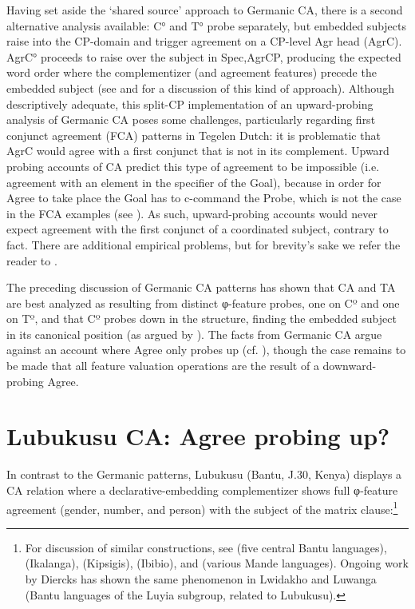 \documentclass[output=paper
,modfonts
,nonflat
]{langsci/langscibook}
\begin{document}
Having set aside the `shared source' approach to Germanic CA, there is a second alternative analysis available: C° and T° probe separately, but embedded subjects raise into the CP-domain and trigger agreement on a CP-level Agr head (AgrC). AgrC° proceeds to raise over the subject in Spec,AgrCP, producing the expected word order where the complementizer (and agreement features) precede the embedded subject (see \citealt{Shlonsky:1994} and \citealt{Zwart:1993} for a discussion of this kind of approach). Although descriptively adequate, this split-CP implementation of an upward-probing analysis of Germanic CA poses some challenges, particularly regarding first conjunct agreement (FCA) patterns in Tegelen Dutch: it is problematic that AgrC would agree with a first conjunct that is not in its complement. Upward probing accounts of CA predict this type of agreement to be impossible (i.e. agreement with an element in the specifier of the Goal), because in order for Agree to take place the Goal has to c-command the Probe, which is not the case in the FCA examples (see \citealt{Baker:2008,Zeijlstra:2012,Wurmbrand:2011}). As such, upward-probing accounts would never expect agreement with the first conjunct of a coordinated subject, contrary to fact. There are additional empirical problems, but for brevity's sake we refer the reader to \citet{vanKoppen:2005,vanKoppen:2017}.

The preceding discussion of Germanic CA patterns has shown that CA and TA are best analyzed as resulting from distinct φ-feature probes, one on Cº and one on Tº, and that Cº probes down in the structure, finding the embedded subject in its canonical position (as argued by \citealt{Carstens:2003,vanKoppen:2005,Haegeman:2012}). The facts from Germanic CA argue against an account where Agree only probes up (cf. \citealt{Zeijlstra:2012,Wurmbrand:2011,Bjorkman:toappearb}), though the case remains to be made that all feature valuation operations are the result of a downward-probing Agree. 

\section{Lubukusu CA: Agree probing up?} \label{LubukusuCA}

In contrast to the Germanic patterns, Lubukusu (Bantu, J.30, Kenya) displays a CA relation where a declarative-embedding complementizer shows full φ-feature agreement (gender, number, and person) with the subject of the matrix clause:\footnote{For discussion of similar constructions, see \citet{Kawasha:2007} (five central Bantu languages), \citet{LetsholoSafir:2017} (Ikalanga), \citet{DiercksRao:2017} (Kipsigis), \citet{Torrence:2016} (Ibibio), and \citet{Idiatov:2010} (various Mande languages). Ongoing work by Diercks has shown the same phenomenon in Lwidakho and Luwanga (Bantu languages of the Luyia subgroup, related to Lubukusu).}
\end{document}
